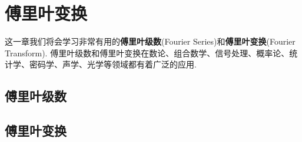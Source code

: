 \chapter{傅里叶变换}
这一章我们将会学习非常有用的\textbf{傅里叶级数}(Fourier Series)和\textbf{傅里叶变换}(Fourier Transform).
傅里叶级数和傅里叶变换在数论、组合数学、信号处理、概率论、统计学、密码学、声学、光学等领域都有着广泛的应用.


\section{傅里叶级数}
\label{sec:fourier_series}

\section{傅里叶变换}
\label{sec:fourier_transform}



